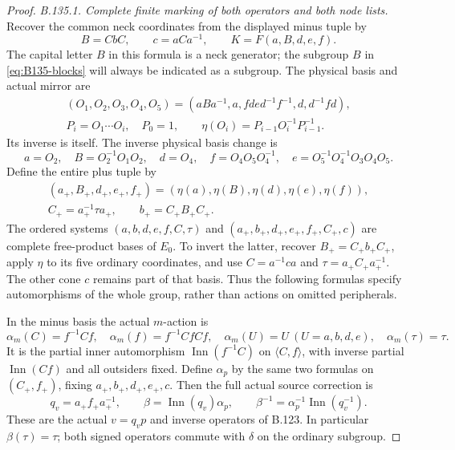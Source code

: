 \begin{proof}
\emph{B.135.1. Complete finite marking of both operators and both node lists.}
Recover the common neck coordinates from the displayed minus tuple by
\[
 B=CbC,\qquad c=aCa^{-1},\qquad K=F(a,B,d,e,f).
\]
The capital letter $B$ in this formula is a neck generator; the subgroup
$B$ in \eqref{eq:B135-blocks} will always be indicated as a subgroup.
The physical basis and actual mirror are
\begin{equation}\label{eq:B135-mirror}
 \begin{gathered}
 (O_1,O_2,O_3,O_4,O_5)
 =(aBa^{-1},a,fde d^{-1}f^{-1},d,d^{-1}fd),\\
 P_i=O_1\cdots O_i,\quad P_0=1,\qquad
 \eta(O_i)=P_{i-1}O_i^{-1}P_{i-1}^{-1}.
 \end{gathered}
\end{equation}
Its inverse is itself. The inverse physical basis change is
\[
 a=O_2,\quad B=O_2^{-1}O_1O_2,\quad d=O_4,\quad
 f=O_4O_5O_4^{-1},\quad e=O_5^{-1}O_4^{-1}O_3O_4O_5.
\]
Define the entire plus tuple by
\begin{equation}\label{eq:B135-plus-tuple}
 \begin{gathered}
 (a_+,B_+,d_+,e_+,f_+)
       =(\eta(a),\eta(B),\eta(d),\eta(e),\eta(f)),\\
 C_+=a_+^{-1}\tau a_+,\qquad b_+=C_+B_+C_+.
 \end{gathered}
\end{equation}
The ordered systems $(a,b,d,e,f,C,\tau)$ and
$(a_+,b_+,d_+,e_+,f_+,C_+,c)$ are complete free-product bases
of $E_0$. To invert the latter, recover $B_+=C_+b_+C_+$,
apply $\eta$ to its five ordinary coordinates, and use
$C=a^{-1}ca$ and $\tau=a_+C_+a_+^{-1}$.
The other cone $c$ remains part of
that basis. Thus the following formulas specify automorphisms
of the whole group, rather than actions on omitted peripherals.

In the minus basis the actual $m$-action is
\begin{equation}\label{eq:B135-m-action}
 \alpha_m(C)=f^{-1}Cf,\quad
 \alpha_m(f)=f^{-1}CfCf,\quad
 \alpha_m(U)=U\ (U=a,b,d,e),\quad \alpha_m(\tau)=\tau.
\end{equation}
It is the partial inner automorphism $\operatorname{Inn}(f^{-1}C)$
on $\langle C,f\rangle$, with inverse partial
$\operatorname{Inn}(Cf)$ and all outsiders fixed.
Define $\alpha_p$ by the same two formulas on
$(C_+,f_+)$, fixing $a_+,b_+,d_+,e_+,c$.
Then the full actual source correction is
\begin{equation}\label{eq:B135-beta}
 q_v=a_+f_+a_+^{-1},\qquad
 \beta=\operatorname{Inn}(q_v)\alpha_p,\qquad
 \beta^{-1}=\alpha_p^{-1}\operatorname{Inn}(q_v^{-1}).
\end{equation}
These are the actual $v=q_vp$ and inverse operators of B.123.
In particular $\beta(\tau)=\tau$; both signed operators
commute with $\delta$ on the ordinary subgroup.


\end{proof}

